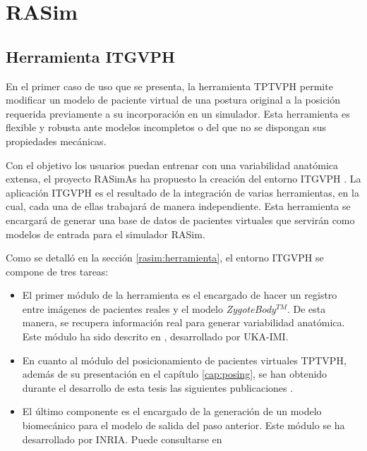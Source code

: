 \section{RASim}


\subsection{Herramienta \acs{ITGVPH}}
\label{result:herramienta}

En el primer caso de uso que se presenta, la herramienta \ac{TPTVPH} permite modificar un modelo de paciente virtual de una postura original a la posición requerida previamente a su incorporación en un simulador. Esta herramienta es flexible y robusta ante modelos incompletos o del que no se dispongan sus propiedades mecánicas. 

Con el objetivo los usuarios puedan entrenar con una variabilidad anatómica extensa, el proyecto \ac{RASimAs} ha propuesto la creación del entorno \ac{ITGVPH} . La aplicación \ac{ITGVPH} es el resultado de la integración de varias herramientas, en la cual, cada una de ellas trabajará de manera independiente. Esta herramienta se encargará de generar una base de datos de pacientes virtuales que servirán como modelos de entrada para el simulador \ac{RASim}. 


Como se detalló en la sección \ref{rasim:herramienta}, el entorno \ac{ITGVPH} se compone de tres tareas:

\begin{itemize}
    \item El primer módulo de la herramienta es el encargado de hacer un registro entre imágenes de pacientes reales y el modelo \emph{ZygoteBody}$^{TM}$. De esta manera, se recupera información real para generar variabilidad anatómica. Este módulo ha sido descrito en \cite{deOliveira:2015}, desarrollado por \ac{UKA-IMI}. 
    \item En cuanto al módulo del posicionamiento de pacientes virtuales \ac{TPTVPH}, además de su presentación en el capítulo \ref{cap:posing}, se han obtenido durante el desarrollo de esta tesis las siguientes publicaciones \cite{ceig.20151197, SUJAR2018268}.
    \item
    El último componente es el encargado de la generación de un modelo biomecánico para el modelo de salida del paso anterior. Este módulo se ha desarrollado por \ac{INRIA}. Puede consultarse en \cite{asdf} 
\end{itemize}

